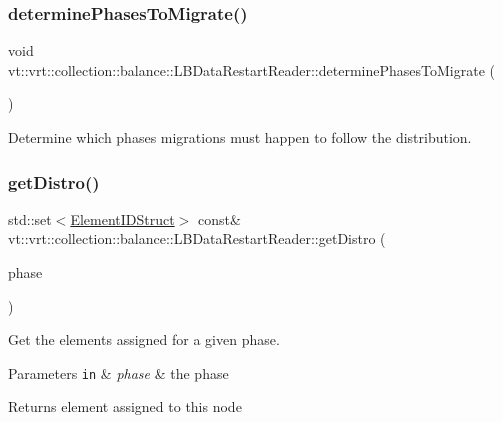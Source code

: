 \subsubsection{\texorpdfstring{determine\+Phases\+To\+Migrate()}{determinePhasesToMigrate()}}
{\footnotesize\ttfamily void vt\+::vrt\+::collection\+::balance\+::\+L\+B\+Data\+Restart\+Reader\+::determine\+Phases\+To\+Migrate (\begin{DoxyParamCaption}{ }\end{DoxyParamCaption})\hspace{0.3cm}{\ttfamily [private]}}



Determine which phases migrations must happen to follow the distribution. 

\mbox{\label{structvt_1_1vrt_1_1collection_1_1balance_1_1_l_b_data_restart_reader_a5774fc11cdfee784ebea3240ec4b61c7}} 
\subsubsection{\texorpdfstring{get\+Distro()}{getDistro()}}
{\footnotesize\ttfamily std\+::set$<$\hyperlink{namespacevt_1_1vrt_1_1collection_1_1balance_a9f5b53fafb270212279a4757d2c4cd28}{Element\+I\+D\+Struct}$>$ const\& vt\+::vrt\+::collection\+::balance\+::\+L\+B\+Data\+Restart\+Reader\+::get\+Distro (\begin{DoxyParamCaption}\item[{\hyperlink{namespacevt_a46ce6733d5cdbd735d561b7b4029f6d7}{Phase\+Type}}]{phase }\end{DoxyParamCaption})\hspace{0.3cm}{\ttfamily [inline]}}



Get the elements assigned for a given phase. 


\begin{DoxyParams}[1]{Parameters}
\mbox{\tt in}  & {\em phase} & the phase\\
\hline
\end{DoxyParams}
\begin{DoxyReturn}{Returns}
element assigned to this node 
\end{DoxyReturn}
\mbox{\label{structvt_1_1vrt_1_1collection_1_1balance_1_1_l_b_data_restart_reader_a2d715003c589c23a80346e4f84443fc4}} 
